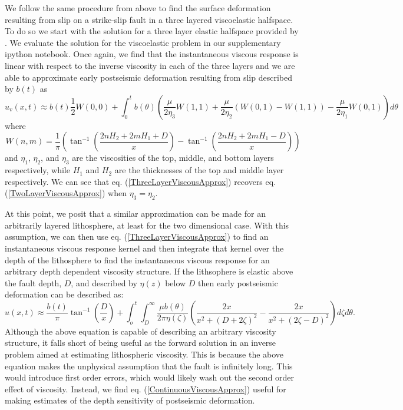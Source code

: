 \documentclass[12pt]{article}
\begin{document}
We follow the same procedure from above to find the surface
deformation resulting from slip on a strike-slip fault in a three
layered viscoelastic halfspace.  To do so we start with the solution
for a three layer elastic halfspace provided by \citet{CJ1972}.  We
evaluate the solution for the viscoelastic problem in our
supplementary ipython notebook. Once again, we find that the
instantaneous viscous response is linear with respect to the inverse
viscosity in each of the three layers and we are able to approximate
early postseismic deformation resulting from slip described by $b(t)$
as
\begin{equation}\label{ThreeLayerViscousApprox}
u_v(x,t) \approx b(t)\frac{1}{2} W(0,0) + 
         \int_0^tb(\theta)\left(\frac{\mu}{2\eta_3}W(1,1)
                               +\frac{\mu}{2\eta_2}(W(0,1) - W(1,1))
                               -\frac{\mu}{2\eta_1}W(0,1)\right)d\theta
\end{equation}
where
\begin{equation}
  W(n,m) = \frac{1}{\pi}\left(\tan^{-1}(\frac{2nH_2 + 2mH_1 + D}{x}) - 
                              \tan^{-1}(\frac{2nH_2 + 2mH_1 - D}{x})\right)
\end{equation}
and $\eta_1$, $\eta_2$, and $\eta_3$ are the viscosities of the top,
middle, and bottom layers respectively, while $H_1$ and $H_2$ are the
thicknesses of the top and middle layer respectively.  We can see that
eq. (\ref{ThreeLayerViscousApprox}) recovers eq.
(\ref{TwoLayerViscousApprox}) when $\eta_3 = \eta_2$. 

At this point, we posit that a similar approximation can be made for
an arbitrarily layered lithosphere, at least for the two dimensional
case.  With this assumption, we can then use
eq. (\ref{ThreeLayerViscousApprox}) to find an instantaneous viscous
response kernel and then integrate that kernel over the depth of the
lithosphere to find the instantaneous viscous response for an
arbitrary depth dependent viscosity structure.  If the lithsophere is
elastic above the fault depth, $D$, and described by $\eta(z)$ below
$D$ then early postseismic deformation can be described as:
\begin{equation}\label{ContinuousViscousApprox}
u(x,t) \approx \frac{b(t)}{\pi}\tan^{-1}(\frac{D}{x}) + 
               \int_o^t\int_D^\infty \frac{\mu b(\theta)}{2\pi\eta(\zeta)}
                                    \left(\frac{2x}{x^2 + \left(D + 2\zeta\right)^2} - 
                                    \frac{2x}{x^2 + \left(2\zeta - D\right)^2}\right)
                                    d\zeta d\theta.
\end{equation}
Although the above equation is capable of describing an arbitrary
viscosity structure, it falls short of being useful as the forward
solution in an inverse problem aimed at estimating lithospheric
viscosity.  This is because the above equation makes the unphysical
assumption that the fault is infinitely long.  This would introduce
first order errors, which would likely wash out the second order effect
of viscosity. Instead, we find eq. (\ref{ContinuousViscousApprox})
useful for making estimates of the depth sensitivity of
postseismic deformation.  
\end{document}
